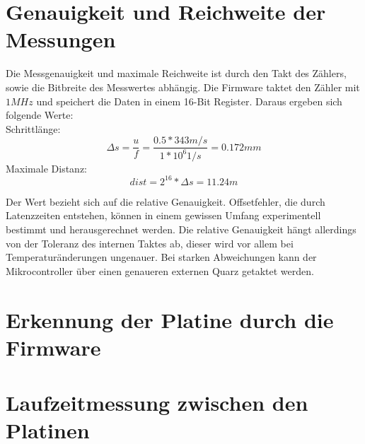 \section{Genauigkeit und Reichweite der Messungen}
Die Messgenauigkeit und maximale Reichweite ist durch den Takt des Zählers, sowie die Bitbreite des Messwertes abhängig. Die Firmware taktet den Zähler mit $1MHz$ und speichert die Daten in einem 16-Bit Register. Daraus ergeben sich folgende Werte:\\
Schrittlänge:
\begin{equation} %
\Delta s = \frac{u}{f} = \frac{0.5 * 343m/s}{1*10^6 1/s} = 0.172 mm
\end{equation}
Maximale Distanz:
\begin{equation}
dist = 2^{16} * \Delta s = 11.24 m
\end{equation}

Der Wert bezieht sich auf die relative Genauigkeit. Offsetfehler, die durch Latenzzeiten entstehen, können in einem gewissen Umfang experimentell bestimmt und herausgerechnet werden. Die relative Genauigkeit hängt allerdings von der Toleranz des internen Taktes ab, dieser wird vor allem bei Temperaturänderungen ungenauer. Bei starken Abweichungen kann der Mikrocontroller über einen genaueren externen Quarz getaktet werden.

\section{Erkennung der Platine durch die Firmware}


\section{Laufzeitmessung zwischen den Platinen}


